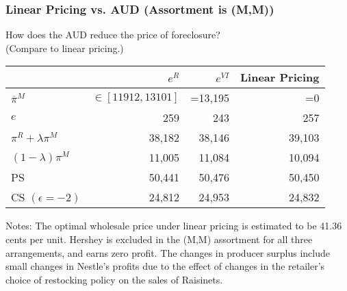 \begin{frame}
\frametitle{Linear Pricing vs. AUD (Assortment is (M,M))}
How does the AUD reduce the price of foreclosure? \\ (Compare to linear pricing.)
\begin{table}[h!]
  \begin{center}
   \label{tab:linearpricing}
    \begin{tabular}{|l|rrr|} 
    \hline 
          & $e^{R}$ & $e^{VI}$ & Linear Pricing   \\ \hline
    $\overline{\pi}^M$ & $\in[11912,13101]$ & =13,195 & =0      \\
    $e$ & 259   & 243   & 257    \\
    $\pi^R + \lambda \pi^M$ & 38,182 & 38,146 & 39,103   \\
    $(1-\lambda) \pi^M$ & 11,005 & 11,084 & 10,094   \\
\hline
    PS & 50,441 & 50,476 & 50,450         \\ 
    CS $(\epsilon=-2)$& 24,812 & 24,953 & 24,832         \\ \hline 
   \end{tabular}
   \end{center}
 \tiny
Notes: The optimal wholesale price under linear pricing is estimated to be 41.36 cents per unit.  Hershey is excluded in the (M,M) assortment for all three arrangements, and earns zero profit.  The changes in producer surplus include small changes in Nestle's profits due to the effect of changes in the retailer's choice of restocking policy on the sales of Raisinets. 
\end{table}

\end{frame}

